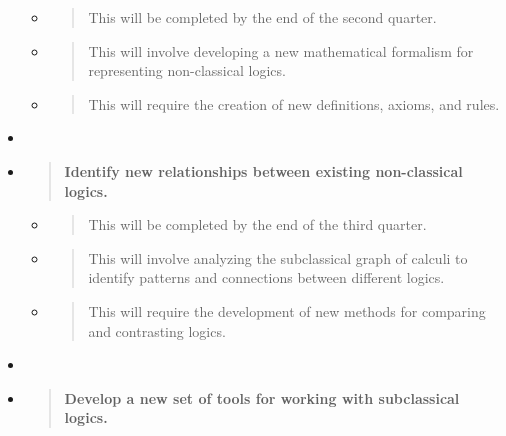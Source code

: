 \begin{itemize}
  \begin{itemize}
  \item
    \begin{quote}
    This will be completed by the end of the second quarter.
    \end{quote}
  \item
    \begin{quote}
    This will involve developing a new mathematical formalism for
    representing non-classical logics.
    \end{quote}
  \item
    \begin{quote}
    This will require the creation of new definitions, axioms, and
    rules.
    \end{quote}
  \end{itemize}
\item
\item
  \begin{quote}
  \textbf{Identify new relationships between existing non-classical
  logics.\\
  }
  \end{quote}

  \begin{itemize}
  \item
    \begin{quote}
    This will be completed by the end of the third quarter.
    \end{quote}
  \item
    \begin{quote}
    This will involve analyzing the subclassical graph of calculi to
    identify patterns and connections between different logics.
    \end{quote}
  \item
    \begin{quote}
    This will require the development of new methods for comparing and
    contrasting logics.
    \end{quote}
  \end{itemize}
\item
\item
  \begin{quote}
  \textbf{Develop a new set of tools for working with subclassical
  logics.\\
  }
  \end{quote}


\end{itemize}
